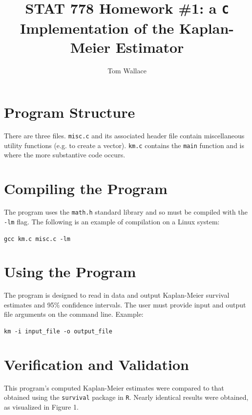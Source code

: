 \documentclass{article}
\title{STAT 778 Homework \#1: a \texttt{C} Implementation of the Kaplan-Meier
Estimator}
\author{Tom Wallace}
\begin{document}
\maketitle

\section{Program Structure}
There are three files. \texttt{misc.c} and its associated header file contain
miscellaneous utility functions (e.g. to create a vector). \texttt{km.c} contains
the \texttt{main} function and is where the more substantive code occurs.

\section{Compiling the Program}
The program uses the \texttt{math.h} standard library and so must be compiled
with the \texttt{-lm} flag. The following is an example of compilation on a
Linux system:

\begin{center}
\texttt{gcc km.c misc.c -lm}
\end{center}

\section{Using the Program}
The program is designed to read in data and output Kaplan-Meier survival
estimates and 95\% confidence intervals. The user must provide input and output
file arguments on the command line. Example:

\begin{center}
\texttt{km -i input\_file -o output\_file}
\end{center}

\section{Verification and Validation}
This program's computed Kaplan-Meier estimates were compared to that obtained
using the \texttt{survival} package in \texttt{R}. Nearly identical results were
obtained, as visualized in Figure 1.
\end{document}
